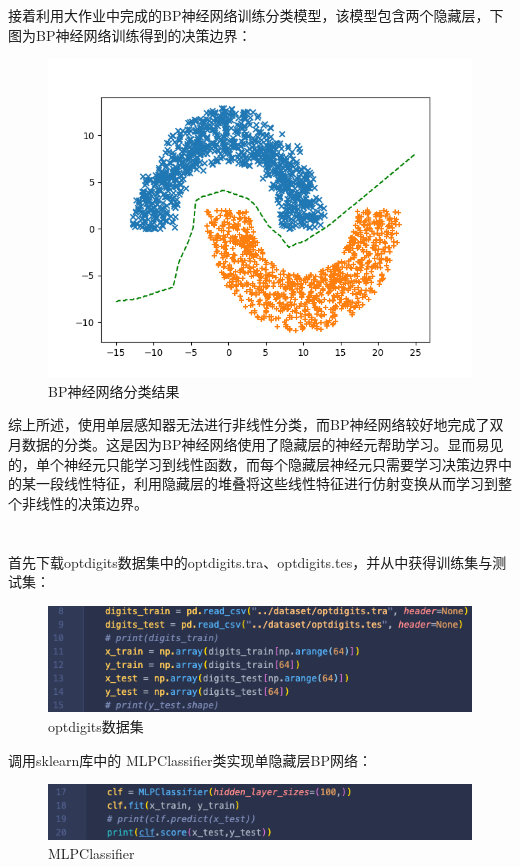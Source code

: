 \documentclass{article}
\begin{document}
接着利用大作业中完成的BP神经网络训练分类模型，该模型包含两个隐藏层，下图为BP神经网络训练得到的决策边界：
\begin{figure}[H]
	\centering
	\includegraphics[scale=0.6]{code/bp.png}
	\caption{BP神经网络分类结果}
\end{figure}

综上所述，使用单层感知器无法进行非线性分类，而BP神经网络较好地完成了双月数据的分类。这是因为BP神经网络使用了隐藏层的神经元帮助学习。显而易见的，单个神经元只能学习到线性函数，而每个隐藏层神经元只需要学习决策边界中的某一段线性特征，利用隐藏层的堆叠将这些线性特征进行仿射变换从而学习到整个非线性的决策边界。

\section{}
首先下载optdigits数据集中的optdigits.tra、optdigits.tes，并从中获得训练集与测试集：
\begin{figure}[H]
	\centering
	\includegraphics[scale=0.6]{dataset.png}
	\caption{optdigits数据集}
\end{figure}

调用sklearn库中的 MLPClassifier类实现单隐藏层BP网络：
\begin{figure}[H]
	\centering
	\includegraphics[scale=0.6]{hand.png}
	\caption{MLPClassifier}
\end{figure}
\end{document}
